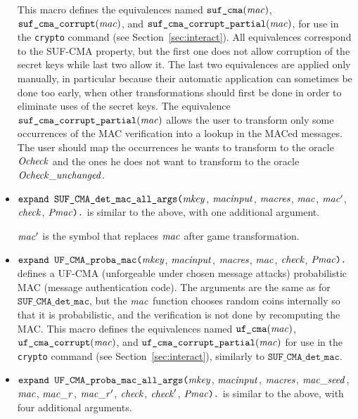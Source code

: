 \documentclass{article}
\begin{document}
\begin{itemize}
   This macro defines the equivalences named
   $\texttt{suf\_cma}(\mathit{mac})$,
   $\texttt{suf\_cma\_corrupt}(\mathit{mac})$, and
   $\texttt{suf\_cma\_corrupt\_partial}(\mathit{mac})$, for use in the
   \texttt{crypto} command (see Section~\ref{sec:interact}).
   All equivalences correspond to the SUF-CMA property, but the first one 
   does not allow corruption of the secret keys while last two allow it.
   The last two equivalences are applied only manually, in particular because their automatic
   application can sometimes be done too early, when other transformations
   should first be done in order to eliminate uses of the secret keys.
   The equivalence $\texttt{suf\_cma\_corrupt\_partial}(\mathit{mac})$ allows the
   user to transform only some occurrences of the MAC verification into a 
   lookup in the MACed messages. The user should map the occurrences 
   he wants to transform to the oracle $\mathit{Ocheck}$ and the ones
   he does not want to transform to the oracle $\mathit{Ocheck\_unchanged}$.

\item $\texttt{expand SUF\_CMA\_det\_mac\_all\_args(}\mathit{mkey}$,
$  \mathit{macinput}$, $\mathit{macres}$, $\mathit{mac}$, $\mathit{mac}'$, $\mathit{check}$,
$  \mathit{Pmac}\texttt{).}$ is similar to the above, with one additional argument.

  $\mathit{mac}'$ is the symbol that replaces $\mathit{mac}$ after game transformation.

\item $\texttt{expand UF\_CMA\_proba\_mac(}\mathit{mkey}$,
$  \mathit{macinput}$, $\mathit{macres}$, $\mathit{mac}$, $\mathit{check}$,
$  \mathit{Pmac}\texttt{).}$ defines a UF-CMA (unforgeable under chosen
  message attacks) probabilistic MAC (message authentication code).
  The arguments are the same as for $\texttt{SUF\_CMA\_det\_mac}$, but the $\mathit{mac}$ function chooses random
  coins internally so that it is probabilistic, and the verification is not done by recomputing the MAC.
   This macro defines the equivalences named
   $\texttt{uf\_cma}(\mathit{mac})$,
   $\texttt{uf\_cma\_corrupt}(\mathit{mac})$, and
   $\texttt{uf\_cma\_corrupt\_partial}(\mathit{mac})$ for use in the
   \texttt{crypto} command (see Section~\ref{sec:interact}),
   similarly to $\texttt{SUF\_CMA\_det\_mac}$.

\item $\texttt{expand UF\_CMA\_proba\_mac\_all\_args(}\mathit{mkey}$,
$  \mathit{macinput}$, $\mathit{macres}$, $\mathit{mac\_seed}$, $\mathit{mac}$, $\mathit{mac\_r}$, $\mathit{mac\_r}'$, $\mathit{check}$, $\mathit{check}'$,
$  \mathit{Pmac}\texttt{).}$ is similar to the above,
  with four additional arguments. 


\end{itemize}
\end{document}
